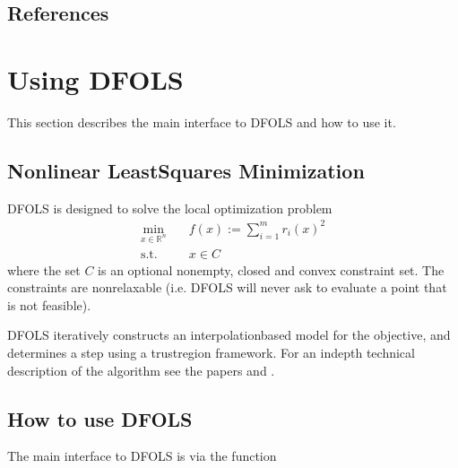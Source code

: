 \documentclass[letterpaper,10pt,english]{sphinxmanual}
\begin{document}
\section{References}
\label{\detokenize{info:references}}
\sphinxstepscope


\chapter{Using DFO\sphinxhyphen{}LS}
\label{\detokenize{userguide:using-dfo-ls}}\label{\detokenize{userguide::doc}}
\sphinxAtStartPar
This section describes the main interface to DFO\sphinxhyphen{}LS and how to use it.


\section{Nonlinear Least\sphinxhyphen{}Squares Minimization}
\label{\detokenize{userguide:nonlinear-least-squares-minimization}}
\sphinxAtStartPar
DFO\sphinxhyphen{}LS is designed to solve the local optimization problem
\begin{equation*}
\begin{split}\min_{x\in\mathbb{R}^n}  &\quad  f(x) := \sum_{i=1}^{m}r_{i}(x)^2 \\
\text{s.t.} &\quad x \in C\end{split}
\end{equation*}
\sphinxAtStartPar
where the set \(C\) is an optional non\sphinxhyphen{}empty, closed and convex constraint set. The constraints are non\sphinxhyphen{}relaxable (i.e. DFO\sphinxhyphen{}LS will never ask to evaluate a point that is not feasible).

\sphinxAtStartPar
DFO\sphinxhyphen{}LS iteratively constructs an interpolation\sphinxhyphen{}based model for the objective, and determines a step using a trust\sphinxhyphen{}region framework.
For an in\sphinxhyphen{}depth technical description of the algorithm see the papers  and .


\section{How to use DFO\sphinxhyphen{}LS}
\label{\detokenize{userguide:how-to-use-dfo-ls}}
\sphinxAtStartPar
The main interface to DFO\sphinxhyphen{}LS is via the function 
\begin{quote}

\begin{sphinxVerbatim}[commandchars=\\\{\}]
   
\end{sphinxVerbatim}
\end{quote}
\end{document}

